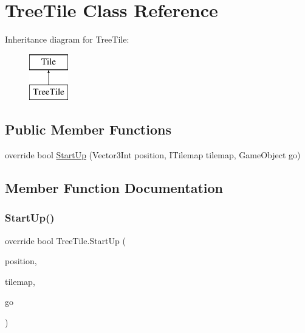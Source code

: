 \hypertarget{class_tree_tile}{}\section{Tree\+Tile Class Reference}
\label{class_tree_tile}
Inheritance diagram for Tree\+Tile\+:\begin{figure}[H]
\begin{center}
\leavevmode
\includegraphics[height=2.000000cm]{class_tree_tile}
\end{center}
\end{figure}
\subsection*{Public Member Functions}
\begin{DoxyCompactItemize}
\item 
override bool \mbox{\hyperlink{class_tree_tile_aba2fd6c692893eeeba8b67f609d283e5}{Start\+Up}} (Vector3\+Int position, I\+Tilemap tilemap, Game\+Object go)
\end{DoxyCompactItemize}


\subsection{Member Function Documentation}
\mbox{\label{class_tree_tile_aba2fd6c692893eeeba8b67f609d283e5}} 
\subsubsection{\texorpdfstring{Start\+Up()}{StartUp()}}
{\footnotesize\ttfamily override bool Tree\+Tile.\+Start\+Up (\begin{DoxyParamCaption}\item[{Vector3\+Int}]{position,  }\item[{I\+Tilemap}]{tilemap,  }\item[{Game\+Object}]{go }\end{DoxyParamCaption})\hspace{0.3cm}{\ttfamily [inline]}}

